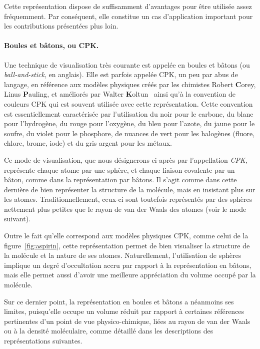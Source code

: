 	Cette représentation dispose de suffisamment d'avantages pour être utilisée assez fréquemment. Par conséquent, elle constitue un cas d'application important pour les contributions présentées plus loin.
		
	\paragraph{Boules et bâtons, ou CPK.} Une technique de visualisation très courante est appelée \og en boules et bâtons \fg{} (ou \emph{ball-and-stick}, en anglais). Elle est parfois appelée CPK, un peu par abus de langage, en référence aux modèles physiques créés par les chimistes Robert \textbf{C}orey, Linus \textbf{P}auling, et améliorés par Walter \textbf{K}oltun~\cite{corey1953molecular, koltun1965space} ainsi qu'à la convention de couleurs CPK qui est souvent utilisée avec cette représentation. Cette convention est essentiellement caractérisée par l'utilisation du noir pour le carbone, du blanc pour l'hydrogène, du rouge pour l'oxygène, du bleu pour l'azote, du jaune pour le soufre, du violet pour le phosphore, de nuances de vert pour les halogènes (fluore, chlore, brome, iode) et du gris argent pour les métaux.
		
	Ce mode de visualisation, que nous désignerons ci-après par l'appellation \emph{CPK}, représente chaque atome par une sphère, et chaque liaison covalente par un bâton, comme dans la représentation par bâtons. Il s'agit comme dans cette dernière de bien représenter la structure de la molécule, mais en insistant plus sur les atomes. Traditionnellement, ceux-ci sont toutefois représentés par des sphères nettement plus petites que le rayon de van der Waals des atomes (voir le mode suivant).
		
	Outre le fait qu'elle correspond aux modèles physiques CPK, comme celui de la figure~\ref{fig:aspirin}, cette représentation permet de bien visualiser la structure de la molécule et la nature de ses atomes. Naturellement, l'utilisation de sphères implique un degré d'occultation accru par rapport à la représentation en bâtons, mais elle permet aussi d'avoir une meilleure appréciation du volume occupé par la molécule.
		
	Sur ce dernier point, la représentation en boules et bâtons a néanmoins ses limites, puisqu'elle occupe un volume réduit par rapport à certaines références pertinentes d'un point de vue physico-chimique, liées au rayon de van der Waals ou à la densité moléculaire, comme détaillé dans les descriptions des représentations suivantes.
		
